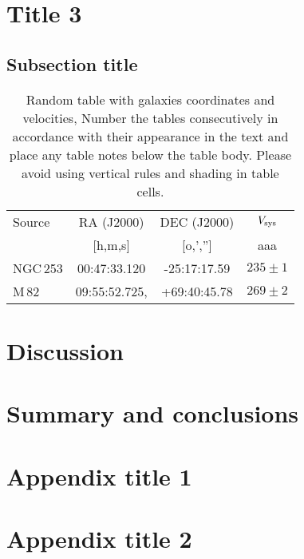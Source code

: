 \documentclass[final,5p,times,twocolumn,authoryear]{elsarticle}
\begin{document}
\section{Title 3}

\subsection{Subsection title}

\begin{table}[h]
\begin{tabular}{l c c c} 
 \hline
 Source & RA (J2000) & DEC (J2000) & $V_{\rm sys}$ \\ 
        & [h,m,s]    & [o,','']    & aaa         \\
 \hline
 NGC\,253 & 	00:47:33.120 & -25:17:17.59 & $235 \pm 1$ \\ 
 M\,82 & 09:55:52.725, & +69:40:45.78 & $269 \pm 2$ 	 \\ 
 \hline
\end{tabular}
\caption{Random table with galaxies coordinates and velocities, Number the tables consecutively in
accordance with their appearance in the text and place any table notes below the table body. Please avoid using vertical rules and shading in table cells.
}
\label{Table1}
\end{table}


\section{Discussion}

\section{Summary and conclusions}

\appendix

\section{Appendix title 1}


\section{Appendix title 2}

 

\end{document}
